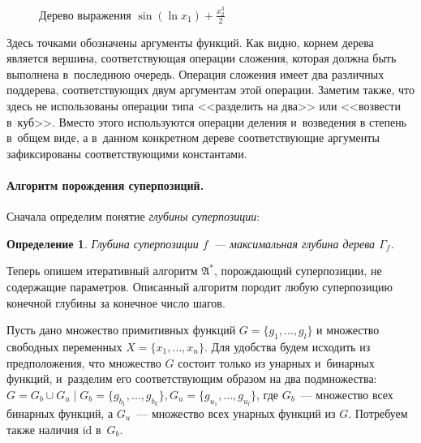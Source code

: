 \documentclass[12pt,a4paper]{article}
\newtheorem{defin}{Определение}
\begin{document}
\begin{figure}[h]
  \centering
  \caption{Дерево выражения $\sin (\ln x_1) + \frac{x_2^3}{2}$}
  \label{fig:expr_tree_example}
\end{figure}

Здесь точками обозначены аргументы функций. Как видно, корнем дерева является
вершина, соответствующая операции сложения, которая должна быть выполнена
в~последнюю очередь. Операция сложения имеет два различных поддерева,
соответствующих двум аргументам этой операции. Заметим также, что здесь не
использованы операции типа <<разделить на два>> или <<возвести в~куб>>.
Вместо этого используются операции деления и~возведения в степень в~общем
виде, а в~данном конкретном дереве соответствующие аргументы зафиксированы
соответствующими константами.

\paragraph{Алгоритм порождения суперпозиций.} Сначала определим понятие
\emph{глубины суперпозиции}:

\begin{defin}
  Глубина суперпозиции $f$~--- максимальная глубина дерева $\Gamma_f$.
\end{defin}

Теперь опишем итеративный алгоритм $\mathfrak{A^*}$, порождающий суперпозиции,
не содержащие параметров. Описанный алгоритм породит любую суперпозицию
конечной глубины за конечное число шагов.

Пусть дано множество примитивных функций $G = \{ g_1, \dots, g_l \}$ и
множество свободных переменных $X = \{ x_1, \dots, x_n \}$. Для удобства будем
исходить из предположения, что множество $G$ состоит только из унарных
и~бинарных функций, и~разделим его соответствующим образом на два подмножества:
$G = G_b \cup G_u \mid G_b = \{ g_{b_1}, \dots, g_{b_k} \}, G_u = \{ g_{u_1}, \dots, g_{u_l} \}$,
где $G_b$~--- множество всех бинарных функций, а $G_u$~--- множество всех
унарных функций из $G$. Потребуем также наличия $\text{id}$ в~$G_b$.
\end{document}

